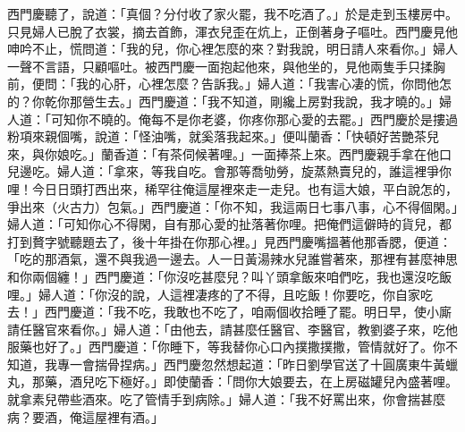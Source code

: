 西門慶聽了，說道：「真個？分付收了家火罷，我不吃酒了。」於是走到玉樓房中。只見婦人已脫了衣裳，摘去首飾，渾衣兒歪在炕上，正倒著身子嘔吐。西門慶見他呻吟不止，慌問道：「我的兒，你心裡怎麼的來？對我說，明日請人來看你。」婦人一聲不言語，只顧嘔吐。被西門慶一面抱起他來，與他坐的，見他兩隻手只揉胸前，便問：「我的心肝，心裡怎麼？告訴我。」婦人道：「我害心凄的慌，你問他怎的？你乾你那營生去。」西門慶道：「我不知道，剛纔上房對我說，我才曉的。」婦人道：「可知你不曉的。俺每不是你老婆，你疼你那心愛的去罷。」西門慶於是摟過粉項來親個嘴，說道：「怪油嘴，就奚落我起來。」便叫蘭香：「快頓好苦艷茶兒來，與你娘吃。」蘭香道：「有茶伺候著哩。」一面捧茶上來。西門慶親手拿在他口兒邊吃。婦人道：「拿來，等我自吃。會那等喬劬勞，旋蒸熱賣兒的，誰這裡爭你哩！今日日頭打西出來，稀罕往俺這屋裡來走一走兒。也有這大娘，平白說怎的，爭出來（火古力）包氣。」西門慶道：「你不知，我這兩日七事八事，心不得個閑。」婦人道：「可知你心不得閑，自有那心愛的扯落著你哩。把俺們這僻時的貨兒，都打到贅字號聽題去了，後十年掛在你那心裡。」見西門慶嘴搵著他那香腮，便道：「吃的那酒氣，還不與我過一邊去。人一日黃湯辣水兒誰嘗著來，那裡有甚麼神思和你兩個纏！」西門慶道：「你沒吃甚麼兒？叫丫頭拿飯來咱們吃，我也還沒吃飯哩。」婦人道：「你沒的說，人這裡凄疼的了不得，且吃飯！你要吃，你自家吃去！」西門慶道：「我不吃，我敢也不吃了，咱兩個收拾睡了罷。明日早，使小廝請任醫官來看你。」婦人道：「由他去，請甚麼任醫官、李醫官，教劉婆子來，吃他服藥也好了。」西門慶道：「你睡下，等我替你心口內撲撒撲撒，管情就好了。你不知道，我專一會揣骨捏病。」西門慶忽然想起道：「昨日劉學官送了十圓廣東牛黃蠟丸，那藥，酒兒吃下極好。」即使蘭香：「問你大娘要去，在上房磁罐兒內盛著哩。就拿素兒帶些酒來。吃了管情手到病除。」婦人道：「我不好罵出來，你會揣甚麼病？要酒，俺這屋裡有酒。」

